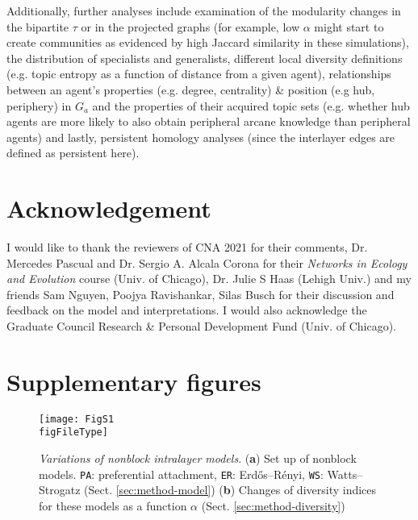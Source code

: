 \documentclass{svproc}
\def\figFileType{.eps}
\begin{document}
Additionally, further analyses include examination of
    the modularity changes in the bipartite $\tau$ \cite{Dankulov2015-uv} or in the projected graphs (for example, low $\alpha$ might start to create communities as evidenced by high Jaccard similarity in these simulations),
    the distribution of specialists and generalists,
    different local diversity definitions (e.g. topic entropy as a function of distance from a given agent),
    relationships between an agent's properties (e.g. degree, centrality) \& position (e.g hub, periphery) in $G_a$ and the properties of their acquired topic sets (e.g. whether hub agents are more likely to also obtain peripheral arcane knowledge than peripheral agents) and lastly,
    persistent homology analyses (since the interlayer edges are defined as persistent here).



\section{Acknowledgement}

I would like to thank
    the reviewers of CNA 2021 for their comments,
    Dr. Mercedes Pascual and Dr. Sergio A. Alcala Corona for their \textit{Networks in Ecology and Evolution} course (Univ. of Chicago),
    Dr. Julie S Haas (Lehigh Univ.)
    and my friends
        Sam Nguyen,
        Poojya Ravishankar,
        Silas Busch
for their discussion and feedback on the model and interpretations.
I would also acknowledge the Graduate Council Research \& Personal Development Fund (Univ. of Chicago).




\vspace{-2em}

\section*{Supplementary figures}

\setcounter{figure}{0}
\renewcommand{\thefigure}{S\arabic{figure}}

\begin{figure}[!ht]
    \centering
    \texttt{[image: FigS1\\figFileType]}
    \caption{
    \textit{Variations of nonblock intralayer models}.
    (\textbf{a}) Set up of nonblock models.
    \texttt{PA}: preferential attachment,
    \texttt{ER}: Erdős–Rényi,
    \texttt{WS}: Watts–Strogatz (Sect. \ref{sec:method-model})
    (\textbf{b}) Changes of diversity indices for these models as a function $\alpha$ (Sect. \ref{sec:method-diversity})
    }
    \label{supp:1}
\end{figure}
\end{document}
